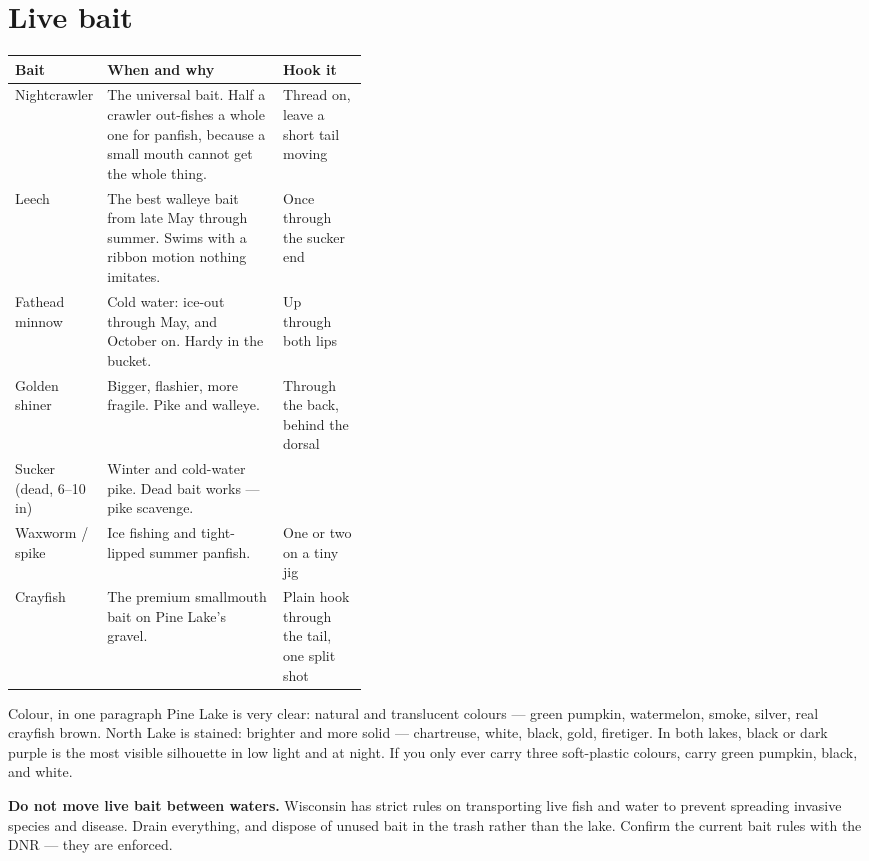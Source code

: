 \section{Live bait}
\begin{tabularx}{\linewidth}{@{}p{0.17\linewidth}L p{0.24\linewidth}@{}}
\toprule
\textbf{Bait} & \textbf{When and why} & \textbf{Hook it}\\
\midrule
Nightcrawler & The universal bait. Half a crawler out-fishes a whole one for panfish, because a small mouth cannot get the whole thing. & Thread on, leave a short tail moving\\
Leech & The best walleye bait from late May through summer. Swims with a ribbon motion nothing imitates. & Once through the sucker end\\
Fathead minnow & Cold water: ice-out through May, and October on. Hardy in the bucket. & Up through both lips\\
Golden shiner & Bigger, flashier, more fragile. Pike and walleye. & Through the back, behind the dorsal\\
Sucker (dead, 6--10\,in) & Winter and cold-water pike. Dead bait works --- pike scavenge. & \\
Waxworm / spike & Ice fishing and tight-lipped summer panfish. & One or two on a tiny jig\\
Crayfish & The premium smallmouth bait on Pine Lake's gravel. & Plain hook through the tail, one split shot\\
\bottomrule
\end{tabularx}

\begin{telospanel}{Colour, in one paragraph}
Pine Lake is very clear: natural and translucent colours --- green pumpkin, watermelon, smoke, silver, real crayfish brown. North Lake is stained: brighter and more solid --- chartreuse, white, black, gold, firetiger. In both lakes, black or dark purple is the most visible silhouette in low light and at night. If you only ever carry three soft-plastic colours, carry green pumpkin, black, and white.
\end{telospanel}

\begin{telosframe}
\textbf{Do not move live bait between waters.} Wisconsin has strict rules on transporting live fish and water to prevent spreading invasive species and disease. Drain everything, and dispose of unused bait in the trash rather than the lake. Confirm the current bait rules with the DNR --- they are enforced.
\end{telosframe}

\TelosColophon

